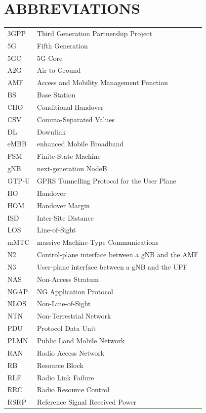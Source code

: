 \section*{ABBREVIATIONS}

\begin{longtable}{p{2.8cm}p{11.2cm}}
3GPP & Third Generation Partnership Project\\
5G & Fifth Generation\\
5GC & 5G Core\\
A2G & Air-to-Ground\\
AMF & Access and Mobility Management Function\\
BS & Base Station\\
CHO & Conditional Handover\\
CSV & Comma-Separated Values\\
DL & Downlink\\
eMBB & enhanced Mobile Broadband\\
FSM & Finite-State Machine\\
gNB & next-generation NodeB\\
GTP-U & GPRS Tunnelling Protocol for the User Plane\\
HO & Handover\\
HOM & Handover Margin\\
ISD & Inter-Site Distance\\
LOS & Line-of-Sight\\
mMTC & massive Machine-Type Communications\\
N2 & Control-plane interface between a gNB and the AMF\\
N3 & User-plane interface between a gNB and the UPF\\
NAS & Non-Access Stratum\\
NGAP & NG Application Protocol\\
NLOS & Non-Line-of-Sight\\
NTN & Non-Terrestrial Network\\
PDU & Protocol Data Unit\\
PLMN & Public Land Mobile Network\\
RAN & Radio Access Network\\
RB & Resource Block\\
RLF & Radio Link Failure\\
RRC & Radio Resource Control\\
RSRP & Reference Signal Received Power\\

\end{longtable}
